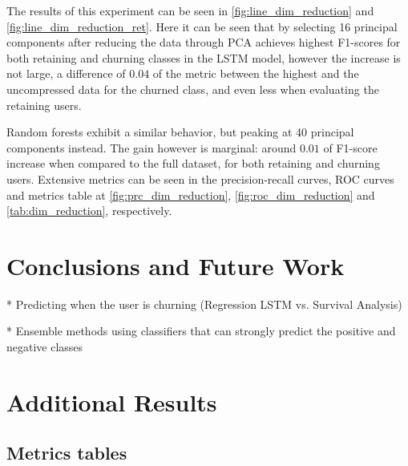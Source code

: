 \documentclass{kththesis}
\begin{document}
The results of this experiment can be seen in \autoref{fig:line_dim_reduction} and \autoref{fig:line_dim_reduction_ret}. Here it can be seen that by selecting 16 principal components after reducing the data through PCA achieves highest F1-scores for both retaining and churning classes in the LSTM model, however the increase is not large, a difference of $0.04$ of the metric between the highest and the uncompressed data for the churned class, and even less when evaluating the retaining users.

Random forests exhibit a similar behavior, but peaking at 40 principal components instead. The gain however is marginal: around $0.01$ of F1-score increase when compared to the full dataset, for both retaining and churning users. Extensive metrics can be seen in the precision-recall curves, ROC curves and metrics table at \autoref{fig:prc_dim_reduction}, \autoref{fig:roc_dim_reduction} and \autoref{tab:dim_reduction}, respectively.

\chapter{Conclusions and Future Work}
\label{cha:conclusion}

* Predicting when the user is churning (Regression LSTM vs. Survival Analysis)

* Ensemble methods using classifiers that can strongly predict the positive and negative classes



\appendix

\chapter{Additional Results}
\label{chap:add_results}

\section{Metrics tables}

\end{document}
